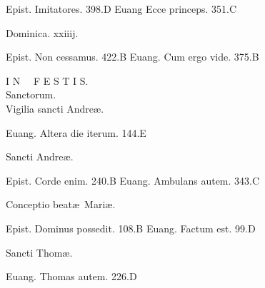 \documentclass[a5paper,10pt]{book}
\def\ae{æ}
\begin{document}
\begin{multicols}{2}
\par \noindent Epist. Imitatores. \hfill 398.D
\newline Euang Ecce princeps. \hfill 351.C%
\newline \vspace{-1.75em}
\begin{center}
\color{red} Dominica. xxiiij.
\end{center}
\vspace{-.75em}
\par \noindent Epist. Non cessamus. \hfill 422.B
\newline Euang. Cum ergo vide. \hfill 375.B
\newline \vspace{-1.75em}
\begin{center}
\color{red} \large I N \ \ F E S T I S.\\
\normalsize Sanctorum.\\
Vigilia sancti Andre\ae .
\end{center}
\vspace{-.75em}
\par \noindent Euang. Altera die iterum. \hfill 144.E
\newline \vspace{-1.75em}
\begin{center}
\color{red} Sancti Andre\ae .
\end{center}
\vspace{-.75em}
\par \noindent Epist. Corde enim. \hfill 240.B
\newline Euang. Ambulans autem. \hfill 343.C
\newline \vspace{-1.75em}
\begin{center}
\color{red} Conceptio beat\ae \ Mari\ae .
\end{center}
\vspace{-.75em}
\par \noindent Epist. Dominus possedit. \hfill 108.B
\newline Euang. Factum est. \hfill 99.D
\newline \vspace{-1.75em}
\begin{center}
\color{red} Sancti Thom\ae .
\end{center}
\vspace{-.75em}
\par \noindent Euang. Thomas autem. \hfill 226.D
\newline \vspace{-1.75em}

\end{multicols}
\end{document}
